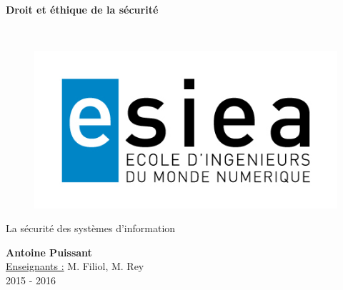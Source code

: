 \begin{titlepage}
      \begin{center}   
        \Huge
        \textbf{Droit et éthique de la sécurité}
        
        \LARGE
        ~
        
        
        \vfill
        \begin{figure}[H]
	    \centering
	    \begin{minipage}{0.9\textwidth}
		\centering
		\includegraphics[width=\textwidth]{./img/esiea.jpeg}
	    \end{minipage}\hfill
	\end{figure}
        \vfill
        
        \vspace{0.5cm}
        
        La sécurité des systèmes d'information
        
        \vspace{2cm}
        \textbf{Antoine Puissant}\\
        \vspace{0.8cm}
        \Large
        \underline{Enseignants :} M. Filiol, M. Rey\\
        \vspace{0.5cm}
        2015 - 2016%
        
    \end{center}
\end{titlepage}